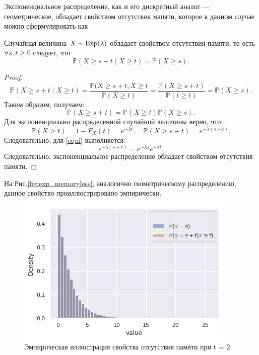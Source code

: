Экспоненциальное распределение, как и его дискретный аналог --- геометрическое,
 обладает свойством отсутствия мапяти, которое в данном случае можно сформулировать
 как
\begin{statement}
	Случайная величина $X\sim \operatorname{\mathrm{Exp}}(\lambda)$ обладает свойством отсутствия памяти,
     то есть $ \forall s,t \ge 0 $ следует, что
	\begin{equation}\label{expmem}
	    \mathbb{P} (X \ge s + t \mid X \ge t) = \mathbb{P} (X \ge s). 
	\end{equation}
\end{statement}
\begin{proof}
	$$
	\mathbb{P}(X \ge s + t \mid X \ge t) = \frac{\mathbb{P}(X \ge s + t, X \ge t}
	 {\mathbb{P}(X \ge t)} = \frac{\mathbb{P} (X \ge s + t)}{\mathbb{P}(t \ge t)}
	 = \mathbb{P}(X \ge s). 
	$$
	Таким образом, получаем:
	\begin{equation}
		\mathbb{P}(X\ge s+t)=\mathbb{P}(X\ge t)\mathbb{P}(X\ge s). \label{equi}
	\end{equation}
	Для экспоненциально распределенной случайной величины верно, что:
	$$
	\mathbb{P} (X \ge t) = 1 - F_X(t) = e^{-\lambda t}, \quad
	\mathbb{P} (X \ge s + t) = e^{-\lambda(s + t)}.
	$$
	Следовательно, для \eqref{equi} выполняется:
	$$
	e^{-\lambda(s + t)} = e^{-\lambda s} e^{-\lambda t}.
	$$
	Следовательно, экспоненциальное распределение обладает свойством отсутствия
	 памяти.
\end{proof}
На Рис.\eqref{fig:exp_memoryless}, аналогично геометрическому распределению,
 данное свойство проиллюстрировано эмпирически.
\begin{figure}[ht]
	\centering
	\includegraphics[width = 0.7\linewidth]{"./resources/exp_memoryless.png"}
	\caption{Эмпирическая иллюстрация свойства отсутствия памяти при t = 2.}
    \label{fig:exp_memoryless}
\end{figure}

